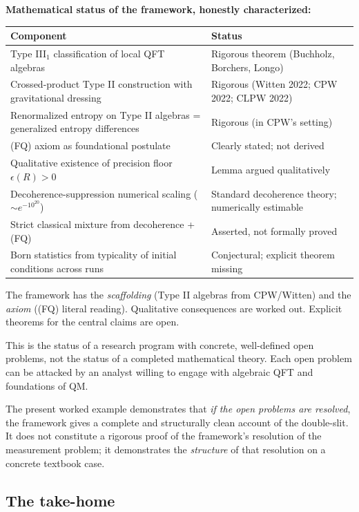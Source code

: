 \documentclass[11pt,a4paper]{article}
\begin{document}
\textbf{Mathematical status of the framework, honestly characterized:}

\begin{center}
\small
\begin{tabularx}{\linewidth}{|Y|Y|}
\hline
\textbf{Component} & \textbf{Status} \\
\hline
Type III$_1$ classification of local QFT algebras & Rigorous theorem (Buchholz, Borchers, Longo) \\
\hline
Crossed-product Type II construction with gravitational dressing & Rigorous (Witten 2022; CPW 2022; CLPW 2022) \\
\hline
Renormalized entropy on Type II algebras = generalized entropy differences & Rigorous (in CPW's setting) \\
\hline
(FQ) axiom as foundational postulate & Clearly stated; not derived \\
\hline
Qualitative existence of precision floor $\epsilon(R) > 0$ & Lemma argued qualitatively \\
\hline
Decoherence-suppression numerical scaling ($\sim e^{-10^{20}}$) & Standard decoherence theory; numerically estimable \\
\hline
Strict classical mixture from decoherence + (FQ) & Asserted, not formally proved \\
\hline
Born statistics from typicality of initial conditions across runs & Conjectural; explicit theorem missing \\
\hline
\end{tabularx}
\end{center}

The framework has the \emph{scaffolding} (Type II algebras from CPW/Witten) and the \emph{axiom} ((FQ) literal reading). Qualitative consequences are worked out. Explicit theorems for the central claims are open.

This is the status of a research program with concrete, well-defined open problems, not the status of a completed mathematical theory. Each open problem can be attacked by an analyst willing to engage with algebraic QFT and foundations of QM.

The present worked example demonstrates that \emph{if the open problems are resolved}, the framework gives a complete and structurally clean account of the double-slit. It does not constitute a rigorous proof of the framework's resolution of the measurement problem; it demonstrates the \emph{structure} of that resolution on a concrete textbook case.

\subsection{The take-home}
\end{document}
